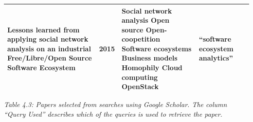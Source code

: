 \documentclass[]{book}
\begin{document}
\begin{longtable}[]{@{}lllll@{}}
\begin{minipage}[t]{0.31\columnwidth}
Lessons learned from applying social network analysis on an industrial
Free/Libre/Open Source Software Ecosystem\strut
\end{minipage} & \begin{minipage}[t]{0.02\columnwidth}\raggedright\strut
2015\strut
\end{minipage} & \begin{minipage}[t]{0.34\columnwidth}\raggedright\strut
Social network analysis Open source Open-coopetition Software ecosystems
Business models Homophily Cloud computing OpenStack\strut
\end{minipage} & \begin{minipage}[t]{0.13\columnwidth}\raggedright\strut
``software ecosystem analytics''\strut
\end{minipage}\tabularnewline
\bottomrule
\end{longtable}

\emph{Table 4.3: Papers selected from searches using Google Scholar. The
column ``Query Used'' describes which of the queries is used to retrieve
the paper.}
\end{document}
